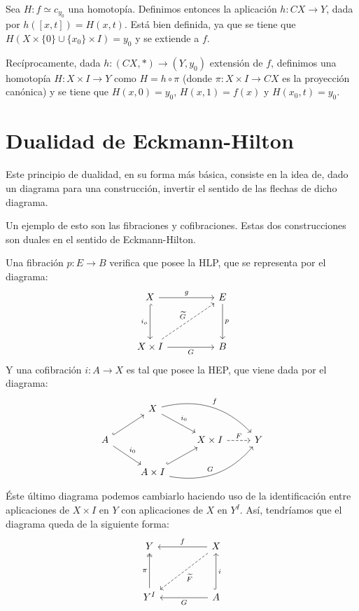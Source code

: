 \begin{demo}
Sea $H : f \simeq c_{y_0}$ una homotopía. Definimos entonces la aplicación $h : CX \longrightarrow Y$, dada por $h([x, t]) = H(x, t)$. Está bien definida, ya que se tiene que  $H(X \times \{ 0 \} \cup \{ x_0 \} \times I) = y_0$ y se extiende a $f$.\par 
Recíprocamente, dada $h : (CX, \ast) \longrightarrow (Y, y_0)$ extensión de $f$, definimos una homotopía $H: X \times I \longrightarrow Y$ como $H = h \circ \pi$ (donde $\pi: X \times I \longrightarrow CX$ es la proyección canónica) y se tiene que 
$H(x, 0) = y_0$, $H(x, 1) = f(x)$ y $H(x_0, t) = y_0$.
\end{demo}

\section{Dualidad de Eckmann-Hilton}
Este principio de dualidad, en su forma más básica, consiste en la idea de, dado un diagrama para una construcción, invertir el sentido de las flechas de dicho diagrama. \par 
Un ejemplo de esto son las fibraciones y cofibraciones. Estas dos construcciones son duales en el sentido de Eckmann-Hilton. \par
Una fibración $p : E \longrightarrow B$ verifica que posee la HLP, que se representa por el diagrama:
\[
\begin{tikzcd}
X \arrow{rr}{g} \arrow[hook, swap]{dd}{i_o} &  & E \arrow{dd}{p} \\
\\
X \times I \arrow{rr}[swap]{G} \arrow[dashed]{uurr}{\widetilde{G}} & & B
\end{tikzcd}
\]
Y una cofibración $i : A \longrightarrow X$ es tal que posee la HEP, que viene dada por el diagrama:
\[
\begin{tikzcd}
	{} 						  & X \drar{i_0} \arrow[bend left]{drr}{f}			   &        					&   \\
	A \urar[hook] \drar{i_0}  &   												   & X \times I \rar[dashed]{F} & Y \\
	   						  & A \times I  \urar[hook] \arrow[bend right]{urr}{G} &   							&
\end{tikzcd}
\]
Éste último diagrama podemos cambiarlo haciendo uso de la identificación entre aplicaciones de $X \times I$ en  $Y$ con aplicaciones de $X$ en $Y^I$. Así, tendríamos que el diagrama queda de la siguiente forma:\[
\begin{tikzcd}
Y & & X \arrow{ll}[swap]{f} \arrow[dashed]{ddll}{\widetilde{F}} \\
\\
Y^I \arrow[two heads]{uu}{\pi} & & A \arrow[hook,swap]{uu}{i} \arrow{ll}{G}
\end{tikzcd}
\]
